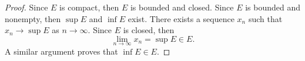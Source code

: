 \begin{Exercise}
\begin{proof}
Since $E$ is compact, then $E$ is bounded and closed. Since $E$ is bounded and nonempty, then $\sup E$ and $\inf E$ exist. There exists a sequence $x_n$ such that $x_n\to \sup E$ as $n\to\infty$. Since $E$ is closed, then
$$
\lim_{n\to\infty} x_n = \sup E \in E.
$$
A similar argument proves that $\inf E\in E$.
\end{proof}
\end{Exercise}